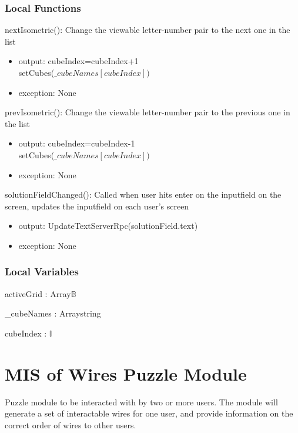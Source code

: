\documentclass[12pt, titlepage]{article}
\begin{document}
\subsubsection{Local Functions}

nextIsometric(): Change the viewable letter-number pair to the next one in the list
\begin{itemize}
    \item output: cubeIndex=cubeIndex+1\\
    setCubes($\_cubeNames[cubeIndex])$
    \item exception: None
\end{itemize}

prevIsometric(): Change the viewable letter-number pair to the previous one in the list
\begin{itemize}
    \item output: cubeIndex=cubeIndex-1\\
    setCubes($\_cubeNames[cubeIndex])$
    \item exception: None
\end{itemize}

solutionFieldChanged(): Called when user hits enter on the inputfield on the screen, updates the inputfield on each user's screen
\begin{itemize}
    \item output: UpdateTextServerRpc(solutionField.text)
    \item exception: None
\end{itemize}

\subsubsection{Local Variables}

activeGrid : Array\textlangle $\mathds{B}$\textrangle

\_cubeNames : Array\textlangle string\textrangle

cubeIndex : $\mathds{I}$

\newpage

\section{MIS of {Wires Puzzle Module}} \label{sec:WiresModule} 

Puzzle module to be interacted with by two or more users. The module will generate a set of interactable wires for one user, and provide information on the correct order of wires to other users.
 
\end{document}
